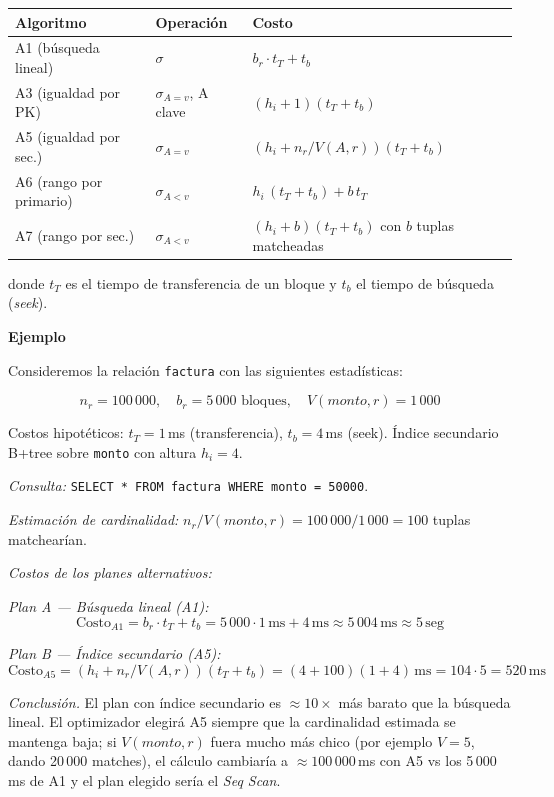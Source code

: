 \documentclass[11pt,a4paper]{article}
\newcommand{\itemcabecera}[1]{\noindent\textbf{#1}\par\medskip}
\newcommand{\bloqueEjemplo}{\itemcabecera{Ejemplo}}
\begin{document}
\begin{center}
\begin{tabular}{lll}
\toprule
Algoritmo & Operación & Costo \\
\midrule
A1 (búsqueda lineal)      & $\sigma$            & $b_r \cdot t_T + t_b$ \\
A3 (igualdad por PK)      & $\sigma_{A=v}$, A clave & $(h_i + 1)(t_T + t_b)$ \\
A5 (igualdad por sec.)    & $\sigma_{A=v}$      & $(h_i + n_r/V(A,r))(t_T + t_b)$ \\
A6 (rango por primario)   & $\sigma_{A<v}$      & $h_i\,(t_T+t_b) + b\,t_T$ \\
A7 (rango por sec.)       & $\sigma_{A<v}$      & $(h_i + b)(t_T + t_b)$ con $b$ tuplas matcheadas \\
\bottomrule
\end{tabular}
\end{center}

donde $t_T$ es el tiempo de transferencia de un bloque y $t_b$ el tiempo de búsqueda (\emph{seek}).

\bloqueEjemplo

Consideremos la relación \texttt{factura} con las siguientes estadísticas:

\[
n_r = 100\,000,\quad b_r = 5\,000 \text{ bloques},\quad V(monto, r) = 1\,000
\]

Costos hipotéticos: $t_T = 1$\,ms (transferencia), $t_b = 4$\,ms (seek). Índice secundario B+tree sobre \texttt{monto} con altura $h_i = 4$.

\textit{Consulta:} \texttt{SELECT * FROM factura WHERE monto = 50000}.

\textit{Estimación de cardinalidad:} $n_r / V(monto,r) = 100\,000 / 1\,000 = 100$ tuplas matchearían.

\textit{Costos de los planes alternativos:}

\textit{Plan A --- Búsqueda lineal (A1):}
\[
\text{Costo}_{A1} = b_r \cdot t_T + t_b = 5\,000 \cdot 1\,\text{ms} + 4\,\text{ms} \approx 5\,004\,\text{ms} \approx 5\,\text{seg}
\]

\textit{Plan B --- Índice secundario (A5):}
\[
\text{Costo}_{A5} = (h_i + n_r/V(A,r))(t_T + t_b) = (4 + 100)(1 + 4)\,\text{ms} = 104 \cdot 5 = 520\,\text{ms}
\]

\textit{Conclusión.} El plan con índice secundario es $\approx 10\times$ más barato que la búsqueda lineal. El optimizador elegirá A5 siempre que la cardinalidad estimada se mantenga baja; si $V(monto, r)$ fuera mucho más chico (por ejemplo $V = 5$, dando 20\,000 matches), el cálculo cambiaría a $\approx 100\,000$\,ms con A5 vs los 5\,000\,ms de A1 y el plan elegido sería el \emph{Seq Scan}.
\end{document}
